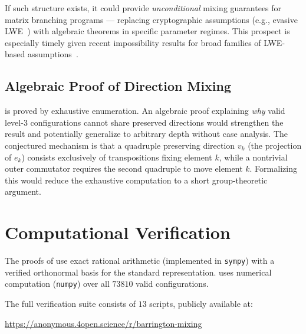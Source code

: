\documentclass[version=submission]{iacrcc}
\begin{document}
If such structure exists, it could provide \emph{unconditional} mixing
guarantees for matrix branching programs --- replacing cryptographic
assumptions (e.g., evasive LWE~\cite{WW21}) with algebraic theorems
in specific parameter regimes.  This prospect is especially timely given
recent impossibility results for broad families of LWE-based
assumptions~\cite{DJMMV25}.


\subsection{Algebraic Proof of Direction Mixing}

 is proved by exhaustive enumeration. An algebraic proof
explaining \emph{why} valid level-$3$ configurations cannot share preserved
directions would strengthen the result and potentially generalize to arbitrary
depth without case analysis. The conjectured mechanism is that a quadruple
preserving direction $v_k$ (the projection of $e_k$) consists exclusively of
transpositions fixing element $k$, while a nontrivial outer commutator requires
the second quadruple to move element $k$. Formalizing this would reduce the
exhaustive computation to a short group-theoretic argument.


\section{Computational Verification}
\label{sec:computation}

The proofs of  use exact rational arithmetic
(implemented in \texttt{sympy}) with a verified orthonormal basis for the
standard representation.  uses numerical computation
(\texttt{numpy}) over all $73810$ valid configurations.

The full verification suite consists of $13$ scripts,
publicly available at:
\begin{center}
\url{https://anonymous.4open.science/r/barrington-mixing}
\end{center}
\end{document}
